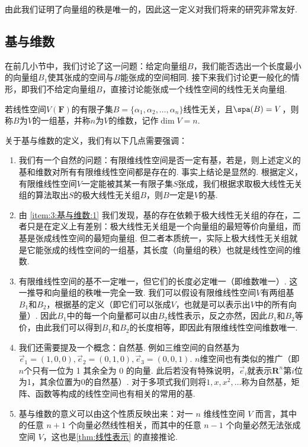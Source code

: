 由此我们证明了向量组的秩是唯一的，因此这一定义对我们将来的研究非常友好.

\subsection{基与维数}

在前几小节中，我们讨论了这一问题：给定向量组$B$，我们能否选出一个长度最小的向量组$B_1$使其张成的空间与$B$能张成的空间相同. 接下来我们讨论更一般化的情形，即我们不给定向量组$B$，直接讨论能张成一个线性空间的线性无关向量组.
\begin{definition}{}{}
    若线性空间$V(\mathbf{F})$的有限子集$B=\{\alpha_1,\alpha_2,\ldots,\alpha_n\}$线性无关，且$\spa(B) = V$，则称$B$为$V$的一组基，并称$n$为$V$的维数，记作$\dim V = n$.
\end{definition}

关于基与维数的定义，我们有以下几点需要强调：
\begin{enumerate}
    \item \label{item:3:基与维数:1}
          我们有一个自然的问题：有限维线性空间是否一定有基，若是，则上述定义的基和维数对所有有限维线性空间都是存在的. 事实上结论是显然的. 根据定义，有限维线性空间$V$一定能被其某一有限子集$S$张成，我们根据求取极大线性无关组的算法取出$S$的极大线性无关组$B$，则$B$一定是$V$的基.

    \item 由 \ref*{item:3:基与维数:1} 我们发现，基的存在依赖于极大线性无关组的存在，二者只是在定义上有差别：极大线性无关组是一个向量组的最短等价向量组，而基是张成线性空间的最短向量组. 但二者本质统一，实际上极大线性无关组就是它能张成的线性空间的一组基，其长度（向量组的秩）也就是线性空间的维数.

    \item 有限维线性空间的基不一定唯一，但它们的长度必定唯一（即维数唯一）. 这一推导和向量组的秩唯一完全一致. 我们可以假设有限维线性空间$V$有两组基$B_1$和$B_2$，根据基的定义（即它们可以张成$V$，也就是可以表示出$V$中的所有向量）. 因此$B_1$中的每一个向量都可以由$B_2$线性表示，反之亦然，因此$B_1$和$B_2$等价，由此我们可以得到$B_1$和$B_2$的长度相等，即因此有限维线性空间维数唯一.

    \item 我们还需要提及一个概念：自然基. 例如三维空间的自然基为$\vec{e}_1=(1,0,0),\vec{e}_2=(0,1,0),\vec{e}_3=(0,0,1)$. $n$维空间也有类似的推广（即$n$个只有一位为 1 其余全为 0 的向量. 此后若没有特殊说明，$\vec{e}_i$就表示$\mathbf{R}^n$第$i$位为1，其余位置为0的自然基）. 对于多项式我们则将$1,x,x^2,\ldots$称为自然基，矩阵、函数等构成的线性空间也有相关的常用的基.

    \item \label{item:3:基与维数:5}
          基与维数的意义可以由这个性质反映出来：对一 $n$ 维线性空间 $V$ 而言，其中的任意 $n + 1$ 个向量必然线性相关，而其中的任意 $n - 1$ 个向量必然无法张成空间 $V$，这也是\autoref{thm:线性表示} 的直接推论.
\end{enumerate}

